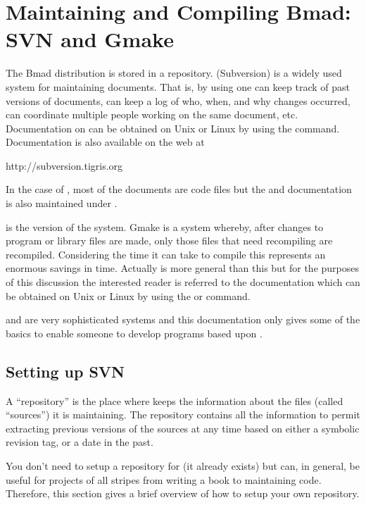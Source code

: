 \chapter{Maintaining and Compiling Bmad: SVN and Gmake}
\label{c:svn_gmake}

The Bmad distribution is stored in a \svn repository. \svn
(Subversion) is a widely used system for maintaining
documents. That is, by using \svn one can keep track of past
versions of documents, can keep a log of who, when, and why changes
occurred, can coordinate multiple people working on the same document,
etc.  Documentation on \svn can be obtained on Unix or Linux by
using the  command. Documentation is also available on
the web at
\begin{example}
  http://subversion.tigris.org
\end{example}
In the case of \bmad, most of the
documents are code files but the \bmad and \tao documentation is
also maintained under \svn.

 is the  version of the  system. Gmake is a
system whereby, after changes to program or library files are made,
only those files that need recompiling are recompiled. Considering the
time it can take to compile this represents an enormous savings in
time. Actually  is more general than this but for the
purposes of this discussion the interested reader is referred to the
 documentation which can be obtained on Unix or Linux by
using the  or  command.

\svn and  are very sophisticated systems and this
documentation only gives some of the basics to enable someone to
develop programs based upon \bmad.

\section{Setting up SVN}
\label{s:svn_setup}

A ``repository'' is the place where \svn keeps the information
about the files (called ``sources'') it is maintaining. The repository
contains all the information to permit extracting previous versions of
the sources at any time based on either a symbolic revision tag, or a
date in the past.

You don't need to setup a \svn repository for \bmad (it already
exists) but \svn can, in general, be useful for projects of all
stripes from writing a book to maintaining code. Therefore, this
section gives a brief overview of how to setup your own \svn
repository.

